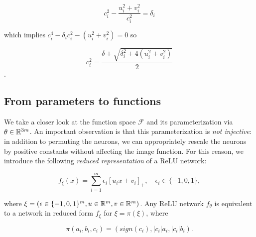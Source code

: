 \begin{equation}
c_i^2 - \frac{u_i^2 + v_i^2}{c_i^2} = \delta_i
\end{equation}

which implies $c_i^4 - \delta_i c_i^2 - (u_i^2 + v_i^2) = 0$ so 

\begin{equation}\label{eq:c_uv}
    c_i^2 = \frac{\delta + \sqrt{\delta_i^2 + 4 (u_i^2 + v_i^2)}}{2} 
\end{equation}.





\subsection{From parameters to functions} 

We take a closer look at the function space $\mathcal{F}$ and its parameterization via $\theta \in \mathbb{R}^{3m}$. 
An important observation is that this parameterization is \emph{not injective}: in addition to permuting the neurons, we can
appropriately rescale the neurons by positive constants without affecting the image function.
For this reason, we introduce the following \emph{reduced representation} of a ReLU network:


\begin{equation}
f_\xi(x) = \sum_{i=1}^{m} \epsilon_i [u_i x + v_i]_+, \quad \epsilon_i \in
\{-1,0,1\},
\end{equation}

where $\xi = (\epsilon \in \{-1, 0, 1\}^m, u \in \mathbb{R}^m, v \in \mathbb{R}^m)$.
Any ReLU network $f_\theta$ is equivalent to a network in reduced form $f_\xi$ for $\xi = \pi(\xi)$, where

\begin{equation}
\pi(a_i,b_i,c_i) = (sign(c_i), |c_i| a_i, |c_i| b_i).
\end{equation}


